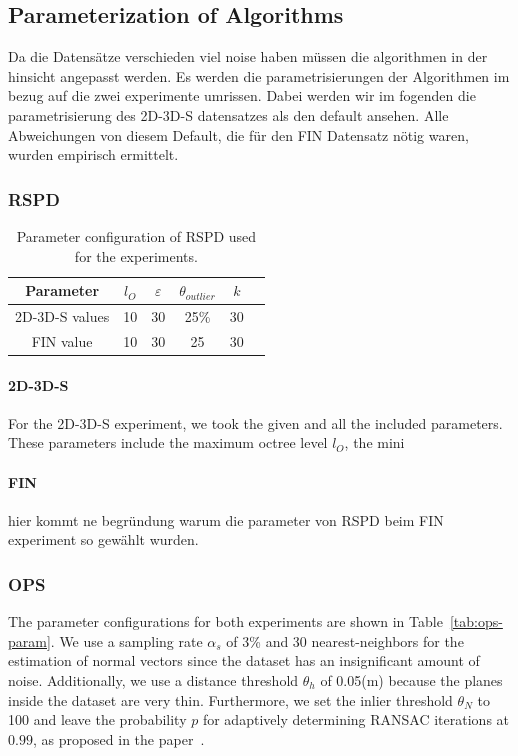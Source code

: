 \documentclass[main.tex]{subfiles}
\begin{document}
\subsection{Parameterization of Algorithms}
Da die Datensätze verschieden viel noise haben müssen die algorithmen in der hinsicht angepasst werden.
Es werden die parametrisierungen der Algorithmen im bezug auf die zwei experimente umrissen.
Dabei werden wir im fogenden die parametrisierung des 2D-3D-S datensatzes als den default ansehen.
Alle Abweichungen von diesem Default, die für den FIN Datensatz nötig waren, wurden empirisch ermittelt.


\subsubsection{RSPD}
\begin{table}[H]
    \centering
    \begin{tabular}{c|ccccc}
        Parameter      & $l_O$ & $\varepsilon$ & $\theta_{outlier}$ & $k$ \\ \hline
        2D-3D-S values & 10    & 30            & 25\%               & 30  \\
        FIN value      & 10    & 30            & 25                 & 30
    \end{tabular}%
    \caption{Parameter configuration of RSPD used for the experiments.}
    \label{tab:rspd-param}
\end{table}

\paragraph{2D-3D-S}
For the 2D-3D-S experiment, we took the given and all the included parameters. These parameters include the maximum octree level $l_O$,
the mini

\paragraph{FIN}
hier kommt ne begründung warum die parameter von RSPD beim FIN experiment so gewählt wurden.

\subsubsection{OPS}
The parameter configurations for both experiments are shown in Table~\ref{tab:ops-param}.
We use a sampling rate $\alpha_s$ of 3\% and 30 nearest-neighbors for the estimation of normal vectors since the dataset has an insignificant
amount of noise. Additionally, we use a distance threshold $\theta_h$ of 0.05(m) because the planes inside the dataset are very thin.
Furthermore, we set the inlier threshold $\theta_N$ to 100 and leave the probability $p$ for adaptively determining RANSAC iterations at $0.99$, as proposed
in the paper~\cite[Section~4A]{Sun_Mordohai_2019}.
\end{document}
